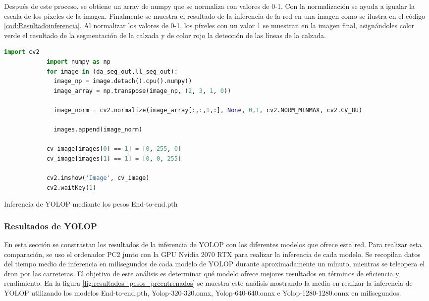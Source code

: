        Después de este proceso, se obtiene un array de numpy que se normaliza con valores de 0-1. Con la normalización 
        se ayuda a igualar la escala de los píxeles de la imagen. Finalmente se muestra el resultado de la inferencia de la red 
        en una imagen como se ilustra en el código \ref{cod:Resultadoinferencia}. Al normalizar los valores de 0-1, los píxeles con un valor 1 se muestran en la imagen final, asignándoles 
        color verde el resultado de la segmentación de la calzada y de color rojo la detección de las líneas de la calzada. \newline
    
        \begin{code}[H]
          \begin{lstlisting}[language=Python]
            import cv2
            import numpy as np
            for image in (da_seg_out,ll_seg_out):
              image_np = image.detach().cpu().numpy()
              image_array = np.transpose(image_np, (2, 3, 1, 0))
    
              image_norm = cv2.normalize(image_array[:,:,1,:], None, 0,1, cv2.NORM_MINMAX, cv2.CV_8U)
    
              images.append(image_norm)
    
            cv_image[images[0] == 1] = [0, 255, 0]
            cv_image[images[1] == 1] = [0, 0, 255]
    
            cv2.imshow('Image', cv_image)
            cv2.waitKey(1)
          \end{lstlisting}
          \caption[Resultado de la inferencia del modelo YOLOP]{Inferencia de YOLOP mediante los pesos End-to-end.pth}
          \label{cod:Resultadoinferencia}
          \end{code}  


\subsubsection{Resultados de YOLOP }
\label{sec:resultados}
En esta sección se constrastan los resultados de la inferencia de YOLOP con los diferentes modelos que ofrece esta red. Para realizar esta comparación, se uso el ordenador 
PC2 junto con la GPU Nvidia 2070 RTX para realizar la inferencia de cada modelo. Se recopilan datos del tiempo medio de inferencia en milisegundos de cada 
modelo de YOLOP durante aproximadamente
un mínuto, mientras se teleopera el dron por las carreteras. El objetivo de este análisis es determinar qué modelo ofrece mejores resultados en términos de eficiencia y rendimiento. 
En la figura \ref{fig:resultados_pesos_preentrenados} se muestra este análisis mostrando la media en realizar la inferencia de YOLOP utilizando los modelos 
End-to-end.pth, Yolop-320-320.onnx, Yolop-640-640.onnx e Yolop-1280-1280.onnx en milisegundos.

